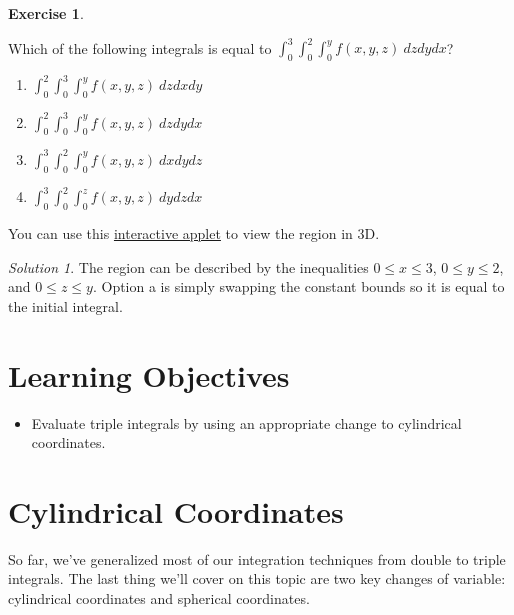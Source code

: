 \documentclass[
]{book}
\providecommand{\tightlist}{%
  \setlength{\itemsep}{0pt}\setlength{\parskip}{0pt}}
\theoremstyle{definition}
\theoremstyle{definition}
\theoremstyle{definition}
\newtheorem{exercise}{Exercise}[chapter]
\theoremstyle{definition}
\theoremstyle{remark}
\newtheorem*{solution}{Solution}
\begin{document}
\begin{exercise}
\protect\hypertarget{exr:unlabeled-div-122}{}\label{exr:unlabeled-div-122}

Which of the following integrals is equal to \(\displaystyle \int_0^3 \int_0^2\int_0^y f(x,y,z)~dzdydx\)?

\begin{enumerate}
\def\labelenumi{\alph{enumi}.}
\tightlist
\item
  \(\displaystyle \int_0^2 \int_0^3\int_0^y f(x,y,z)~dzdxdy\)
\item
  \(\displaystyle \int_0^2 \int_0^3\int_0^y f(x,y,z)~dzdydx\)
\item
  \(\displaystyle \int_0^3 \int_0^2\int_0^y f(x,y,z)~dxdydz\)
\item
  \(\displaystyle \int_0^3 \int_0^2\int_0^z f(x,y,z)~dydzdx\)
\end{enumerate}

You can use this \href{https://www.geogebra.org/m/an5kuqrz}{interactive applet} to view the region in 3D.

\end{exercise}

\begin{solution}

The region can be described by the inequalities \(0\leq x\leq3\), \(0\leq y \leq 2\), and \(0\leq z\leq y\). Option a is simply swapping the constant bounds so it is equal to the initial integral.

\end{solution}

\hypertarget{learning-objectives-15}{%
\section{Learning Objectives}\label{learning-objectives-15}}

\begin{itemize}
\tightlist
\item
  Evaluate triple integrals by using an appropriate change to cylindrical coordinates.
\end{itemize}

\hypertarget{cylindrical-coordinates}{%
\section{Cylindrical Coordinates}\label{cylindrical-coordinates}}

So far, we've generalized most of our integration techniques from double to triple integrals. The last thing we'll cover on this topic are two key changes of variable: cylindrical coordinates and spherical coordinates.
\end{document}

